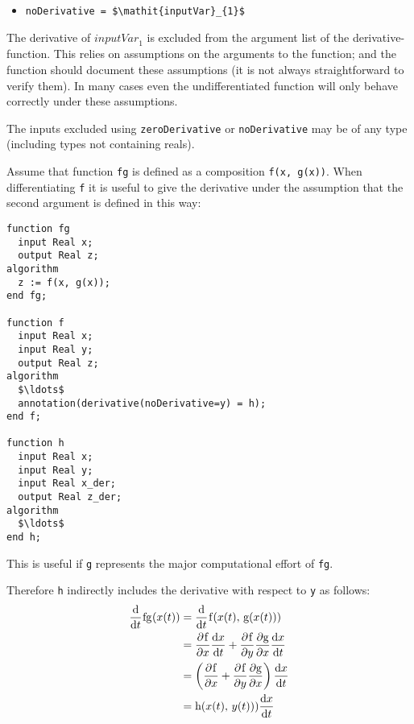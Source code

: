 \begin{itemize}
\item
  \lstinline[language=grammar]!noDerivative = $\mathit{inputVar}_{1}$!
\end{itemize}

The derivative of $\mathit{inputVar}_{1}$ is excluded from the argument list of the derivative-function.
This relies on assumptions on the arguments to the function; and the function should document these assumptions (it is not always straightforward to verify them).
In many cases even the undifferentiated function will only behave correctly under these assumptions.

The inputs excluded using \lstinline!zeroDerivative! or \lstinline!noDerivative! may be of any type (including types not containing reals).

\begin{nonnormative}
Assume that function \lstinline!fg! is defined as a composition \lstinline!f(x, g(x))!.
When differentiating \lstinline!f! it is useful to give the derivative under the
assumption that the second argument is defined in this way:
\begin{lstlisting}[language=modelica]
function fg
  input Real x;
  output Real z;
algorithm
  z := f(x, g(x));
end fg;

function f
  input Real x;
  input Real y;
  output Real z;
algorithm
  $\ldots$
  annotation(derivative(noDerivative=y) = h);
end f;

function h
  input Real x;
  input Real y;
  input Real x_der;
  output Real z_der;
algorithm
  $\ldots$
end h;
\end{lstlisting}
This is useful if \lstinline!g! represents the major computational
effort of \lstinline!fg!.

Therefore \lstinline!h! indirectly includes the derivative with respect to \lstinline!y! as follows:
\begin{equation*}
\begin{aligned}
\udfrac{}{t}\text{\lstinline!fg!}(x(t))
&= \udfrac{}{t}\text{\lstinline!f!}(x(t),\, \text{\lstinline!g!}(x(t)))\\
&= \pdfrac{\text{\lstinline!f!}}{x} \udfrac{x}{t} + \pdfrac{\text{\lstinline!f!}}{y} \pdfrac{\text{\lstinline!g!}}{x} \udfrac{x}{t}\\
&= \left(\pdfrac{\text{\lstinline!f!}}{x} + \pdfrac{\text{\lstinline!f!}}{y} \pdfrac{\text{\lstinline!g!}}{x} \right) \udfrac{x}{t}\\
&= \text{\lstinline!h!}(x(t),\, y(t))) \udfrac{x}{t}
\end{aligned}
\end{equation*}
\end{nonnormative}

